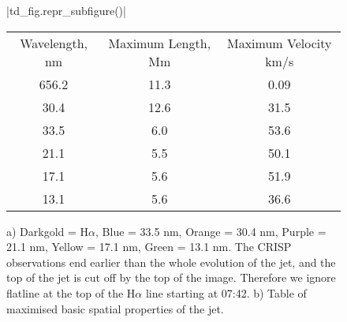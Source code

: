 \documentclass{emulateapj}
\begin{document}
\begin{figure}[t]
	\centering
	\py[T-D-plots]|td_fig.repr_subfigure()|
	
	\begin{subtable}[b]{0.5\textwidth}
		\centering
		\begin{tabular}{ccc}
		Wavelength, nm & Maximum Length, Mm & Maximum Velocity km/s \\
		656.2 & 11.3 & 0.09 \\
		30.4 & 12.6 & 31.5 \\
		33.5 & 6.0 & 53.6 \\
		21.1 & 5.5 & 50.1 \\
		17.1 & 5.6 & 51.9 \\
		13.1 & 5.6 & 36.6 \\
		\end{tabular}
		\caption{}
	\end{subtable}
	\caption{a) Darkgold = H$\alpha$, Blue = 33.5 nm, Orange = 30.4 nm, Purple = 21.1 nm, Yellow = 17.1 nm, Green = 13.1 nm. The CRISP observations end earlier than the whole evolution of the jet, and the top of the jet is cut off by the top of the image. Therefore we ignore flatline at the top of the H$\alpha$ line starting at 07:42. b) Table of maximised basic spatial properties of the jet.}
\end{figure}


%
%
%
%
%
%
\end{document}
